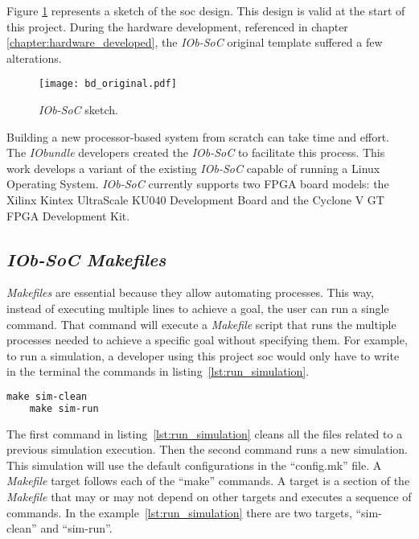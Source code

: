 Figure \ref{fig:bd_original} represents a sketch of the \acrshort{soc} design. This design is valid at the start of this project. During the hardware development, referenced in chapter \ref{chapter:hardware_developed}, the \textit{IOb-SoC} original template suffered a few alterations.

\begin{figure}[!ht]
    \centering
    \texttt{[image: bd\_original.pdf]}
    \caption{\textit{IOb-SoC} sketch.}
    \label{fig:bd_original}
\end{figure}

Building a new processor-based system from scratch can take time and effort. The \textit{IObundle} developers created the \textit{IOb-SoC} to facilitate this process. This work develops a variant of the existing \textit{IOb-SoC} capable of running a Linux Operating System. \textit{IOb-SoC} currently supports two FPGA board models: the Xilinx Kintex UltraScale KU040 Development Board and the Cyclone V GT FPGA Development Kit.

\subsection{\textit{IOb-SoC} \textit{Makefiles}}
\label{subsection:iob_makefiles}
\textit{Makefiles} are essential because they allow automating processes. This way, instead of executing multiple lines to achieve a goal, the user can run a single command. That command will execute a \textit{Makefile} script that runs the multiple processes needed to achieve a specific goal without specifying them. For example, to run a simulation, a developer using this project \acrshort{soc} would only have to write in the terminal the commands in listing~\ref{lst:run_simulation}.

\begin{lstlisting}[language=make, caption={Run a simulation.}, label=lst:run_simulation]
    make sim-clean
    make sim-run
\end{lstlisting}

The first command in listing~\ref{lst:run_simulation} cleans all the files related to a previous simulation execution. Then the second command runs a new simulation. This simulation will use the default configurations in the \enquote{config.mk} file. A \textit{Makefile} target follows each of the \enquote{make} commands. A target is a section of the \textit{Makefile} that may or may not depend on other targets and executes a sequence of commands. In the example~\ref{lst:run_simulation} there are two targets, \enquote{sim-clean} and \enquote{sim-run}.

